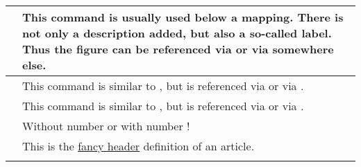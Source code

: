 \begin{footnotesize}
\begin{longtable}{ | P{0.53\textwidth} | p{0.4\textwidth} | }
        \hline
                                             &
        This command is usually used below a mapping. There is not only a
        description added, but also a so-called label. Thus the figure can be
        referenced via
        or via
        somewhere else.                                                                                      \\
        \hline
                                           &
        This command is similar to
        ,
        but is referenced via
         or via
        .                                              \\
        \hline
                                               &
        This command is similar to
        , but is
        referenced via
         or via
        .                                                \\
        \hline
                                                           &
        Without number \tsDegree{} or with number !                                            \\
        \hline
                                                         &
        This is the \href{https://ctan.org/pkg/fancyhdr}{fancy header} definition of an article.             \\
        \hline
                                                            &

\end{longtable}
\end{footnotesize}
